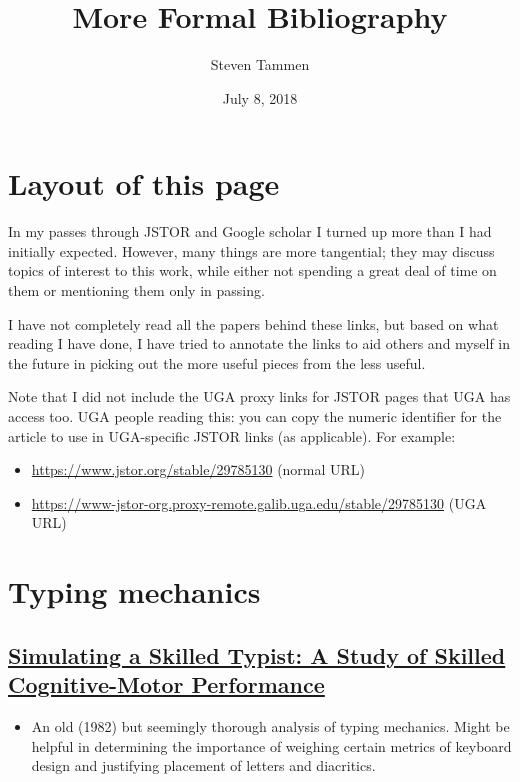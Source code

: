 \documentclass[11pt]{article}
\author{Steven Tammen}
\date{July 8, 2018}
\title{More Formal Bibliography}
\begin{document}
\maketitle
\setcounter{tocdepth}{2}
\tableofcontents


\section{Layout of this page}
\label{sec:org99eadee}

In my passes through JSTOR and Google scholar I turned up more than I had initially expected. However, many things are more tangential; they may discuss topics of interest to this work, while either not spending a great deal of time on them or mentioning them only in passing.

I have not completely read all the papers behind these links, but based on what reading I have done, I have tried to annotate the links to aid others and myself in the future in picking out the more useful pieces from the less useful.

Note that I did not include the UGA proxy links for JSTOR pages that UGA has access too. UGA people reading this: you can copy the numeric identifier for the article to use in UGA-specific JSTOR links (as applicable). For example:

\begin{itemize}
\item \url{https://www.jstor.org/stable/29785130} (normal URL)
\item \url{https://www-jstor-org.proxy-remote.galib.uga.edu/stable/29785130} (UGA URL)
\end{itemize}

\section{Typing mechanics}
\label{sec:org0b9935a}

\subsection{\href{https://onlinelibrary.wiley.com/doi/pdf/10.1207/s15516709cog0601\_1}{Simulating a Skilled Typist: A Study of Skilled Cognitive-Motor Performance}}
\label{sec:org8bae75b}

\begin{itemize}
\item An old (1982) but seemingly thorough analysis of typing mechanics. Might be helpful in determining the importance of weighing certain metrics of keyboard design and justifying placement of letters and diacritics.
\end{itemize}
\end{document}
